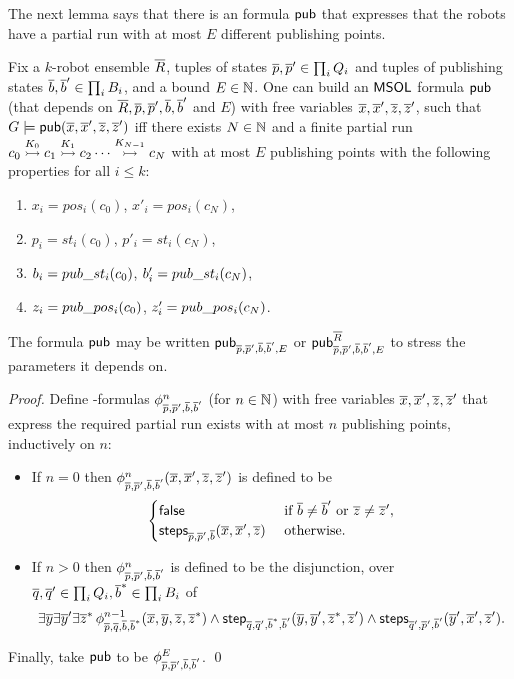  
The next lemma says that there is an \msol formula $\pub$ that expresses that the robots have a partial run with at most $E$ different publishing points.

\begin{lemma} \label{lem:boundedly-many-publishing-points}
Fix a $k$-robot ensemble $\tup{R}$, tuples of states $\tup{p},\tup{p}' \in \prod_i Q_i$ and tuples of publishing states 
$\tup{b},\tup{b}' \in \prod_i B_i$, and a bound $E \in \nat$.
One can build an $\msol$ formula $\pub$ (that depends on $\tup{R},\tup{p},\tup{p}',\tup{b},\tup{b}'$ and $E$) with free variables 
$\tup{x}, \tup{x}', \tup{z},\tup{z}'$, such that 
$G \models \pub(\tup{x}, \tup{x}', \tup{z},\tup{z}')$ iff there exists $N \in \nat$ and a finite partial run $\onestep{c_0}{c_1}{K_0}\onestep{}{c_2}{K_1} \cdots \onestep{}{c_N}{K_{N-1}}$ with at most $E$ publishing points with the following properties for all $i \leq k$:
\begin{enumerate}
 \item $x_i = pos_i(c_0)$, $x'_i = pos_i(c_N)$,
 \item $p_i = st_i(c_0)$, $p'_i = st_i(c_N)$,
 \item $b_i = \bcst_i(c_0)$, $b'_i = \bcst_i(c_N)$,
 \item $z_i = \bcpos_i(c_0)$, $z'_i = \bcpos_i(c_N)$.
 \end{enumerate}
The formula $\pub$ may be written $\pub_{\tup{p},\tup{p}',\tup{b},\tup{b}',E}$ or $\pub^{\tup{R}}_{\tup{p},\tup{p}',\tup{b},\tup{b}',E}$ to stress the parameters it depends on.
\end{lemma}

\begin{proof}
Define \msol-formulas $\phi_{\tup{p},\tup{p}',\tup{b},\tup{b}'}^{n}$ (for $n \in \nat$) with free variables $\tup{x},\tup{x}',\tup{z},\tup{z}'$ that express the required partial run exists with at most $n$ publishing points, inductively on $n$:
\begin{itemize}
 \item If $n = 0$ then $\phi_{\tup{p},\tup{p}',\tup{b},\tup{b}'}^{n}(\tup{x},\tup{x}',\tup{z},\tup{z}')$ is defined to be 
 \[
  \begin{cases}
   \false & \mbox{ if  $\tup{b} \neq \tup{b}'$ or $\tup{z} \neq \tup{z}'$},\\
   \steps_{\tup{p},\tup{p}',\tup{b}}(\tup{x},\tup{x}',\tup{z}) & \mbox{ otherwise.}
  \end{cases}
 \]
 \item If $n > 0$ then $\phi_{\tup{p},\tup{p}',\tup{b},\tup{b}'}^{n}$ is defined to be the disjunction, over $\tup{q},\tup{q}' \in \prod_i Q_i, 
 \tup{b}^* \in \prod_i B_i$ of 
 \[
  \exists \tup{y} \exists \tup{y}' \exists \tup{z}^*\, 
  \phi_{\tup{p},\tup{q},\tup{b},\tup{b}^*}^{n-1}(\tup{x},\tup{y},\tup{z},\tup{z}^*) 
  \wedge 
  \step_{\tup{q},\tup{q}',\tup{b}^*,\tup{b}'}(\tup{y},\tup{y}',\tup{z}^*,\tup{z}')
  \wedge
  \steps_{\tup{q}',\tup{p}',\tup{b}'}(\tup{y}',\tup{x}',\tup{z}').
 \]
 \end{itemize}

Finally, take $\pub$ to be $\phi_{\tup{p},\tup{p}',\tup{b},\tup{b}'}^{E}$. \qed
\end{proof}


